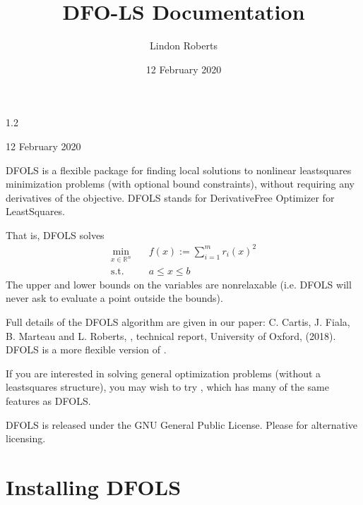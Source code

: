 \documentclass[letterpaper,10pt,english]{sphinxmanual}
\title{DFO-LS Documentation}
\date{12 February 2020}
\author{Lindon Roberts}
\begin{document}
\pagestyle{empty}
\sphinxmaketitle
\pagestyle{plain}
\sphinxtableofcontents
\pagestyle{normal}
\label{\detokenize{index::doc}}


 1.2

 12 February 2020

 

DFO\sphinxhyphen{}LS is a flexible package for finding local solutions to nonlinear least\sphinxhyphen{}squares minimization problems (with optional bound constraints), without requiring any derivatives of the objective. DFO\sphinxhyphen{}LS stands for Derivative\sphinxhyphen{}Free Optimizer for Least\sphinxhyphen{}Squares.

That is, DFO\sphinxhyphen{}LS solves
\begin{equation*}
\begin{split}\min_{x\in\mathbb{R}^n}  &\quad  f(x) := \sum_{i=1}^{m}r_{i}(x)^2 \\
\text{s.t.} &\quad  a \leq x \leq b\end{split}
\end{equation*}
The upper and lower bounds on the variables are non\sphinxhyphen{}relaxable (i.e. DFO\sphinxhyphen{}LS will never ask to evaluate a point outside the bounds).

Full details of the DFO\sphinxhyphen{}LS algorithm are given in our paper: C. Cartis, J. Fiala, B. Marteau and L. Roberts, , technical report, University of Oxford, (2018). DFO\sphinxhyphen{}LS is a more flexible version of .

If you are interested in solving general optimization problems (without a least\sphinxhyphen{}squares structure), you may wish to try , which has many of the same features as DFO\sphinxhyphen{}LS.

DFO\sphinxhyphen{}LS is released under the GNU General Public License. Please  for alternative licensing.


\chapter{Installing DFO\sphinxhyphen{}LS}
\label{\detokenize{install:installing-dfo-ls}}\label{\detokenize{install::doc}}
\end{document}
